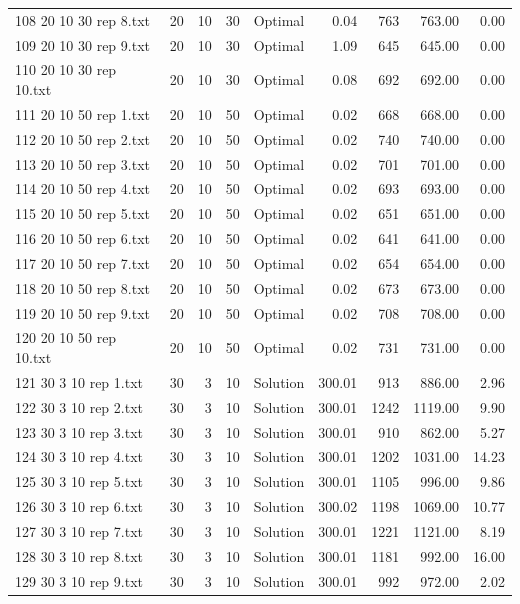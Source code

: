 \begin{longtable}{lrrllrrrr}
108 20 10 30 rep 8.txt & 20 & 10 & 30 & Optimal &  0.04 & 763 & 763.00 &  0.00\\
109 20 10 30 rep 9.txt & 20 & 10 & 30 & Optimal &  1.09 & 645 & 645.00 &  0.00\\
110 20 10 30 rep 10.txt & 20 & 10 & 30 & Optimal &  0.08 & 692 & 692.00 &  0.00\\
111 20 10 50 rep 1.txt & 20 & 10 & 50 & Optimal &  0.02 & 668 & 668.00 &  0.00\\
112 20 10 50 rep 2.txt & 20 & 10 & 50 & Optimal &  0.02 & 740 & 740.00 &  0.00\\
113 20 10 50 rep 3.txt & 20 & 10 & 50 & Optimal &  0.02 & 701 & 701.00 &  0.00\\
114 20 10 50 rep 4.txt & 20 & 10 & 50 & Optimal &  0.02 & 693 & 693.00 &  0.00\\
115 20 10 50 rep 5.txt & 20 & 10 & 50 & Optimal &  0.02 & 651 & 651.00 &  0.00\\
116 20 10 50 rep 6.txt & 20 & 10 & 50 & Optimal &  0.02 & 641 & 641.00 &  0.00\\
117 20 10 50 rep 7.txt & 20 & 10 & 50 & Optimal &  0.02 & 654 & 654.00 &  0.00\\
118 20 10 50 rep 8.txt & 20 & 10 & 50 & Optimal &  0.02 & 673 & 673.00 &  0.00\\
119 20 10 50 rep 9.txt & 20 & 10 & 50 & Optimal &  0.02 & 708 & 708.00 &  0.00\\
120 20 10 50 rep 10.txt & 20 & 10 & 50 & Optimal &  0.02 & 731 & 731.00 &  0.00\\
121 30 3 10 rep 1.txt & 30 & 3 & 10 & Solution & 300.01 & 913 & 886.00 &  2.96\\
122 30 3 10 rep 2.txt & 30 & 3 & 10 & Solution & 300.01 & 1242 & 1119.00 &  9.90\\
123 30 3 10 rep 3.txt & 30 & 3 & 10 & Solution & 300.01 & 910 & 862.00 &  5.27\\
124 30 3 10 rep 4.txt & 30 & 3 & 10 & Solution & 300.01 & 1202 & 1031.00 & 14.23\\
125 30 3 10 rep 5.txt & 30 & 3 & 10 & Solution & 300.01 & 1105 & 996.00 &  9.86\\
126 30 3 10 rep 6.txt & 30 & 3 & 10 & Solution & 300.02 & 1198 & 1069.00 & 10.77\\
127 30 3 10 rep 7.txt & 30 & 3 & 10 & Solution & 300.01 & 1221 & 1121.00 &  8.19\\
128 30 3 10 rep 8.txt & 30 & 3 & 10 & Solution & 300.01 & 1181 & 992.00 & 16.00\\
129 30 3 10 rep 9.txt & 30 & 3 & 10 & Solution & 300.01 & 992 & 972.00 &  2.02\\

\end{longtable}
